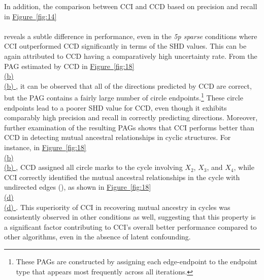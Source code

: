 \documentclass[twoside, 11pt]{article}
\newcommand*{\figref}[2][]{%
  \hyperref[{fig:#2}]{%
    Figure~\ref*{fig:#2}%
    \ifx\\#1\\%
    \else
      #1%
    \fi
  }%
}
\begin{document}

\restoregeometry

In addition, the comparison between CCI and CCD based on precision and recall in \figref[]{14} reveals a subtle difference in performance, even in the \textit{5p sparse} conditions where CCI outperformed CCD significantly in terms of the SHD values. This can be again attributed to CCD having a comparatively high uncertainty rate. From the PAG estimated by CCD in \figref[(b)]{18}, it can be observed that all of the directions predicted by CCD are correct, but the PAG contains a fairly large number of circle endpoints.\footnote{These PAGs are constructed by assigning each edge-endpoint to the endpoint type that appears most frequently across all iterations.} These circle endpoints lead to a poorer SHD value for CCD, even though it exhibits comparably high precision and recall in correctly predicting directions.
Moreover, further examination of the resulting PAGs shows that CCI performs better than CCD in detecting mutual ancestral relationships in cyclic structures. For instance, in \figref[(b)]{18}, CCD assigned all circle marks to the cycle involving $X_2$, $X_3$, and $X_4$, while CCI correctly identified the mutual ancestral relationships in the cycle with undirected edges (\textemdash), as shown in \figref[(d)]{18}. This superiority of CCI in recovering mutual ancestry in cycles was consistently observed in other conditions as well, suggesting that this property is a significant factor contributing to CCI's overall better performance compared to other algorithms, even in the absence of latent confounding.
\end{document}
